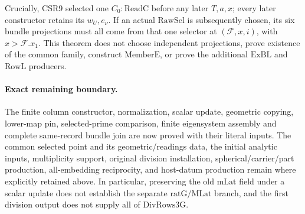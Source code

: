 Crucially, CSR9 selected one \(C_0:\mathrm{ReadC}\)
before any later \(T,a,x\); every later constructor
retains its \(w_U,e_\nu\). If an actual
\(\mathrm{RawSel}\) is subsequently chosen, its six
bundle projections must all come from that one
selector at \((\mathcal F,x,i)\), with \(x>\mathcal F.x_1\).
This theorem does not choose independent projections,
prove existence of the common family, construct
\(\mathrm{MemberE}\), or prove the additional
\(\mathrm{ExBL}\) and \(\mathrm{RowL}\) producers.

\paragraph{Exact remaining boundary.}
The finite column constructor, normalization, scalar
update, geometric copying, lower-map pin, selected-prime
comparison, finite eigensystem assembly and complete
same-record bundle join are now proved with their
literal inputs. The common selected point and its
geometric/readings data, the initial analytic inputs,
multiplicity support, original division installation,
spherical/carrier/part production, all-embedding
reciprocity, and host-datum production remain where
explicitly retained above. In particular, preserving
the old \(\mathrm{mLat}\) field under a scalar update
does not establish the separate \(\mathrm{ratG/MLat}\)
branch, and the first division output does not supply
all of \(\mathrm{DivRows3G}\).
